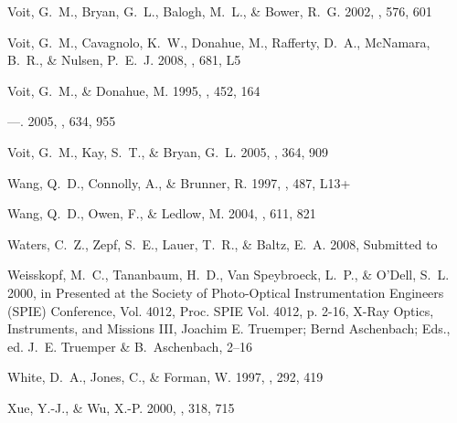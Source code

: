 \documentclass[12pt,preprint]{aastex}
\begin{document}
\begin{thebibliography}{139}
{Voit}, G.~M., {Bryan}, G.~L., {Balogh}, M.~L., \& {Bower}, R.~G. 2002, \apj,
  576, 601

{Voit}, G.~M., {Cavagnolo}, K.~W., {Donahue}, M., {Rafferty}, D.~A.,
  {McNamara}, B.~R., \& {Nulsen}, P.~E.~J. 2008, \apjl, 681, L5

{Voit}, G.~M., \& {Donahue}, M. 1995, \apj, 452, 164

---. 2005, \apj, 634, 955

{Voit}, G.~M., {Kay}, S.~T., \& {Bryan}, G.~L. 2005, \mnras, 364, 909

{Wang}, Q.~D., {Connolly}, A., \& {Brunner}, R. 1997, \apjl, 487, L13+

{Wang}, Q.~D., {Owen}, F., \& {Ledlow}, M. 2004, \apj, 611, 821

{Waters}, C.~Z., {Zepf}, S.~E., {Lauer}, T.~R., \& {Baltz}, E.~A. 2008,
  Submitted to \apj

{Weisskopf}, M.~C., {Tananbaum}, H.~D., {Van Speybroeck}, L.~P., \& {O'Dell},
  S.~L. 2000, in Presented at the Society of Photo-Optical Instrumentation
  Engineers (SPIE) Conference, Vol. 4012, Proc. SPIE Vol. 4012, p. 2-16, X-Ray
  Optics, Instruments, and Missions III, Joachim E. Truemper; Bernd Aschenbach;
  Eds., ed. J.~E. {Truemper} \& B.~{Aschenbach}, 2--16

{White}, D.~A., {Jones}, C., \& {Forman}, W. 1997, \mnras, 292, 419

{Xue}, Y.-J., \& {Wu}, X.-P. 2000, \mnras, 318, 715

\end{thebibliography}








\end{document}
